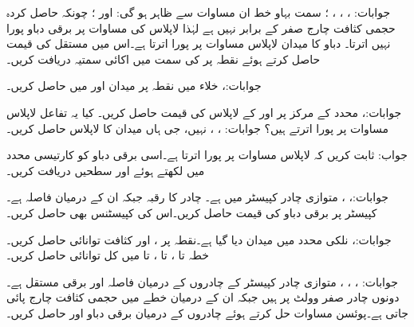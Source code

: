 جوابات: ، ،
 ، ؛ سمت بہاو خط ان مساوات سے ظاہر ہو گی:  اور ؛ چونکہ حاصل کردہ حجمی کثافت چارج صفر کے برابر نہیں ہے لہٰذا لاپلاس کی مساوات پر برقی دباو پورا نہیں اترتا۔
دباو کا میدان  لاپلاس مساوات پر پورا اترتا ہے۔اس میں مستقل  کی قیمت حاصل کرتے ہوئے نقطہ  پر  کی سمت میں اکائی سمتیہ دریافت کریں۔

جوابات:، 
خلاء میں نقطہ  پر میدان  اور  میں  حاصل کریں۔

جوابات:، 
محدد کے مرکز  پر   اور  کے لاپلاس کی قیمت حاصل کریں۔ کیا یہ تفاعل لاپلاس مساوات پر پورا اترتے ہیں؟
جوابات: ، ، نہیں، جی ہاں
میدان  کا لاپلاس حاصل کریں۔

جواب: 
ثابت کریں کہ  لاپلاس مساوات پر پورا اترتا ہے۔اسی برقی دباو کو کارتیسی محدد میں لکھتے ہوئے  اور  سطحیں دریافت کریں۔

جوابات:، ، 
متوازی چادر کپیسٹر میں  ہے۔ چادر کا رقبہ  جبکہ ان کے درمیان فاصلہ  ہے۔کپیسٹر پر برقی دباو کی قیمت حاصل کریں۔اس کی کپیسٹنس بھی حاصل کریں۔

جوابات:، 
نلکی محدد میں میدان  دیا گیا ہے۔نقطہ  پر ،  اور کثافت توانائی حاصل کریں۔خطہ  تا ،  تا ،   تا  میں کل توانائی حاصل کریں۔

جوابات: ، ، ،
متوازی چادر کپیسٹر کے چادروں کے درمیان فاصلہ  اور برقی مستقل  ہے۔دونوں چادر صفر وولٹ پر ہیں جبکہ ان کے درمیان خطے  میں حجمی کثافت چارج  پائی جاتی ہے۔پوئسن  مساوات حل کرتے ہوئے چادروں کے درمیان برقی دباو اور  حاصل کریں۔

